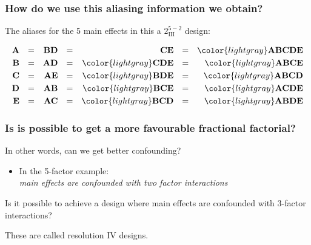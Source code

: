\documentclass[handout,11pt,aspectratio=169,mathserif]{beamer}
\begin{document}
\begin{frame}\frametitle{How do we use this aliasing information we obtain?}
	
	\vspace{1cm}
	The aliases for the 5 main effects in this a $2^{5-2}_{\textrm{III}}$ design:
	
	\vspace{0.5cm}
	\begin{align*}
		\textbf{A} &&=&& \textbf{BD} &&=&& \textbf{CE} &&=&&\color{lightgray} \textbf{ABCDE}\\
		\textbf{B} &&=&& \textbf{AD} &&=&& \color{lightgray} \textbf{CDE} &&=&& {\color{lightgray}\textbf{ABCE}}\\
		\textbf{C} &&=&& \textbf{AE} &&=&& \color{lightgray} \textbf{BDE} &&=&& \color{lightgray}\textbf{ABCD}\\
		\textbf{D} &&=&& \textbf{AB} &&=&& \color{lightgray}\textbf{BCE}  &&=&& \color{lightgray} \textbf{ACDE}\\
		\textbf{E} &&=&& \textbf{AC} &&=&& \color{lightgray} \textbf{BCD} &&=&& \color{lightgray} \textbf{ABDE}\\
	\end{align*}
	
\end{frame}

\begin{frame}\frametitle{Is is possible to get a more favourable fractional factorial? }
	
	\begin{exampleblock}{}
		In other words, can we get better confounding?
	\end{exampleblock}
	
	
	
	\begin{itemize}
		\item	In the 5-factor example:\\
			\qquad\qquad \emph{main effects are confounded with two factor interactions}
		
	\end{itemize}
	\vspace{1cm}
	
			Is it possible to achieve a design where main effects are confounded with 3-factor interactions?
			
	\vspace{1cm}
	
		\pause
		These are called resolution \textrm{IV} designs.
\end{frame}
\end{document}
